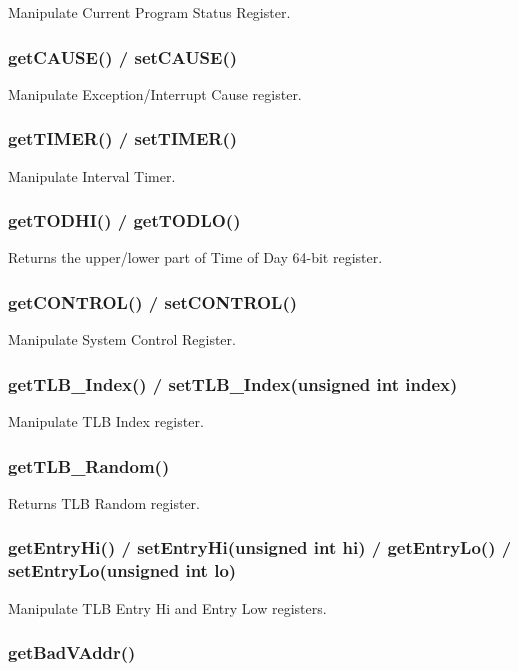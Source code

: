 Manipulate Current Program Status Register.

\subsubsection{getCAUSE() / setCAUSE()}

Manipulate Exception/Interrupt Cause register.

\subsubsection{getTIMER() / setTIMER()}

Manipulate Interval Timer.

\subsubsection{getTODHI() / getTODLO()}

Returns the upper/lower part of Time of Day 64-bit register.

\subsubsection{getCONTROL() / setCONTROL()}

Manipulate System Control Register.

\subsubsection{getTLB\_Index() / setTLB\_Index(unsigned int index)}

Manipulate TLB Index register.

\subsubsection{getTLB\_Random()}

Returns TLB Random register.

\subsubsection{getEntryHi() / setEntryHi(unsigned int hi) / getEntryLo() / setEntryLo(unsigned int lo)}

Manipulate TLB Entry Hi and Entry Low registers.

\subsubsection{getBadVAddr()}

